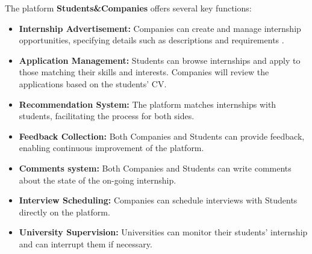 \documentclass[a4paper,12pt]{article}
\begin{document}
The platform \textbf{Students\&Companies} offers several key functions:

\begin{itemize}

    \item \textbf{Internship Advertisement:} 
    Companies can create and manage internship opportunities, specifying details such as descriptions and requirements .

    \item \textbf{Application Management:} 
    Students can browse internships and apply to those matching their skills and interests. Companies will review the applications based on the students' CV.

    \item \textbf{Recommendation System:} 
    The platform matches internships with students, facilitating the process for both sides.

    \item \textbf{Feedback Collection:} 
    Both Companies and Students can provide feedback, enabling continuous improvement of the platform.

    \item \textbf{Comments system:} 
    Both Companies and Students can write comments about the state of the on-going internship.

    \item \textbf{Interview Scheduling:} 
    Companies can schedule interviews with Students directly on the platform.

    \item \textbf{University Supervision:} 
    Universities can monitor their students' internship and can interrupt them if necessary.

\end{itemize}
\end{document}
